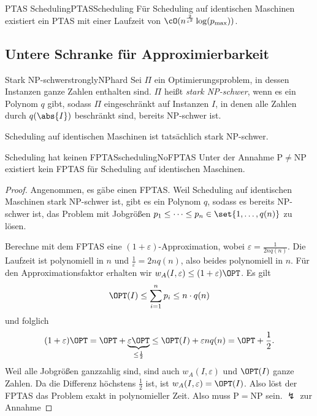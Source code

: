 \documentclass[language=ngerman,algolist]{TemplateLecture}
\begin{document}
\begin{thm}{PTAS Scheduling}{PTASScheduling}
    Für Scheduling auf identischen Maschinen existiert ein PTAS mit einer Laufzeit von $\cO(n^{\frac{2}{\varepsilon^2}}\log(p_{\max}))$.
\end{thm}


\subsection{Untere Schranke für Approximierbarkeit}

\begin{defi}{Stark NP-schwer}{stronglyNPhard}
    Sei $\Pi$ ein Optimierungsproblem, in dessen Instanzen ganze Zahlen enthalten sind. $\Pi$ heißt \emph{stark NP-schwer}, wenn es ein Polynom $q$ gibt, sodass $\Pi$ eingeschränkt auf Instanzen $I$, in denen alle Zahlen durch $q(\abs{I})$ beschränkt sind, bereits NP-schwer ist.
\end{defi}

Scheduling auf identischen Maschinen ist tatsächlich stark NP-schwer.

\begin{thm}{Scheduling hat keinen FPTAS}{schedulingNoFPTAS}
    Unter der Annahme $\mathrm{P} \neq \mathrm{NP}$ existiert kein FPTAS für Scheduling auf identischen Maschinen.
\end{thm}
\begin{proof}
    Angenommen, es gäbe einen FPTAS. Weil Scheduling auf identischen Maschinen stark NP-schwer ist, gibt es ein Polynom $q$, sodass es bereits NP-schwer ist, das Problem mit Jobgrößen $p_1 \leq \cdots \leq p_n \in \set{1,\ldots, q(n)}$ zu lösen.

    Berechne mit dem FPTAS eine $(1+\varepsilon)$-Approximation, wobei $\varepsilon = \frac{1}{2nq(n)}$. Die Laufzeit ist polynomiell in $n$ und $\frac{1}{\varepsilon} = 2nq(n)$, also beides polynomiell in $n$. Für den Approximationsfaktor erhalten wir $w_A(I, \varepsilon) \leq (1+\varepsilon) \OPT$.
    Es gilt 
    \begin{equation*}
        \OPT(I) \leq \sum_{i = 1}^n p_i \leq n \cdot q(n)
    \end{equation*}
    und folglich 
    \begin{equation*}
        (1+\varepsilon)\OPT = \OPT + \underset{\leq \frac{1}{2}}{\underbrace{\varepsilon\OPT}}  \leq \OPT(I) + \varepsilon n q(n) = \OPT + \frac{1}{2}.
    \end{equation*}
    Weil alle Jobgrößen ganzzahlig sind, sind auch $w_A(I, \varepsilon)$ und $\OPT(I)$ ganze Zahlen. Da die Differenz höchstens $\frac{1}{2}$ ist, ist $w_A(I, \varepsilon) = \OPT(I)$. Also löst der FPTAS das Problem exakt in polynomieller Zeit. Also muss $\mathrm{P} = \mathrm{NP}$ sein. $\lightning$ zur Annahme
\end{proof}
\end{document}
